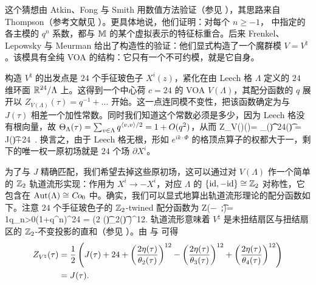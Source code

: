 这个猜想由 Atkin、Fong 与 Smith 用数值方法验证（参见 \cite{fong1980characters,smith1985head}），其思路来自 Thompson（参考文献见 \cite{MR2201600}）。更具体地说，他们证明：对每个 $n\ge -1$，\cite{conway_norton} 中指定的各主模的 $q^n$ 系数，都与 $\mathbb{M}$ 的某个虚拟表示的特征标重合。后来 Frenkel、Lepowsky 与 Meurman \cite{FLMPNAS,FLMBerk} 给出了构造性的验证：他们显式构造了一个魔群模 $V=V^\natural$。该模具有全纯 VOA 的结构：它只有一个不可约模，就是它自身。


构造 $V^\natural$ 的出发点是 $24$ 个手征玻色子 $X^i(z)$，紧化在由 Leech 格 $\Lambda$ 定义的 $24$ 维环面 $\mathbb{R}^{24}/\Lambda$ 上。这得到一个中心荷 $c=24$ 的 VOA $V(\Lambda)$，其配分函数的 $q$ 展开以
\( Z_{V(\Lambda)}(\tau)=q^{-1}+\dots\) 开始。这一点连同模不变性，把该函数确定为与 $J(\tau)$ 相差一个加性常数。同时我们知道这个常数必须是多少，因为 Leech 格没有根向量，故 $\Theta_{\Lambda}(\tau) =\sum_{v\in \Lambda} q^{\langle v,v\rangle/2}  = 1+ O(q^2)$，从而
\be
Z_{V(\Lambda)}(\tau)= {\Theta_{\Lambda}(\t)\over \eta^{24}(\t)} = J(\t)+24~. 
\ee
换言之，由于 Leech 格无根，形如 $e^{ik\cdot\Phi}$ 的格顶点算子的权都大于一，剩下的唯一权一原初场就是 $24$ 个场 $\partial X^i$。


为了与 $J$ 精确匹配，我们希望去掉这些原初场，这可以通过对 $V(\Lambda)$ 作一个简单的 $\mathbb{Z}_2$ 轨道流形实现：作用为 $X^i\rightarrow-X^i$，对应 $\Lambda$ 的 $\lbrace{\rm id},-{\rm id}\rbrace\cong\mathbb{Z}_2$ 对称性，它包含在 $\operatorname{\text{Aut}}(\Lambda)\cong\operatorname{\textsl{Co}}_0$ 中。确实，我们可以显式地算出轨道流形理论的配分函数如下。注意 $24$ 个手征玻色子的 $\mathbb{Z}_2$-twined 配分函数为
\be
Z\left(\mbox{\fontsize{9}{10}\selectfont $-$}\underset{+}{\Box}~;\t\right)= {1\over q\prod_{n>0}(1+q^{n})^{24}} = \left(2 \eta(\t)\over \theta_2(\t) \right)^{12}. 
\ee
轨道流形意味着 $V^\natural$ 是未扭结扇区与扭结扇区的 $\mathbb{Z}_2$-不变投影的直和（参见 ）。由  与  可得
\begin{gather}
\begin{split}
Z_{V^\natural}(\tau)& ={1\over 2}\left( J(\tau)+24 + \left(2 \eta(\tau)\over \theta_2(\tau) \right)^{12} -  \left(2 \eta(\tau)\over \theta_3(\tau) \right)^{12} +\left(2 \eta(\tau)\over \theta_4(\tau) \right)^{12} \right) \\& = J(\tau). 
\end{split}
\end{gather}

